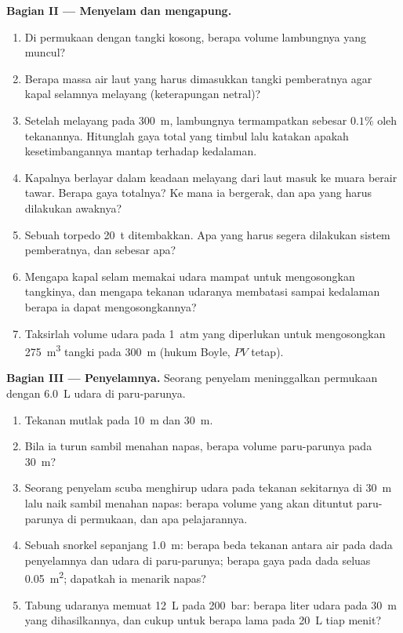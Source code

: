 \begin{problem}
\medskip
\noindent\textbf{Bagian II --- Menyelam dan mengapung.}
\begin{enumerate}[resume]
  \item Di permukaan dengan tangki kosong, berapa volume lambungnya yang muncul?
  \item Berapa massa air laut yang harus dimasukkan tangki pemberatnya agar
        kapal selamnya melayang (keterapungan netral)?
  \item Setelah melayang pada \qty{300}{m}, lambungnya termampatkan sebesar
        $0.1\%$ oleh tekanannya. Hitunglah gaya total yang timbul lalu katakan
        apakah kesetimbangannya mantap terhadap kedalaman.
  \item Kapalnya berlayar dalam keadaan melayang dari laut masuk ke
        muara berair tawar. Berapa gaya totalnya? Ke mana ia bergerak, dan apa yang harus dilakukan
        awaknya?
  \item Sebuah torpedo \qty{20}{t} ditembakkan. Apa yang harus segera dilakukan sistem
        pemberatnya, dan sebesar apa?
  \item Mengapa kapal selam memakai udara mampat untuk mengosongkan tangkinya, dan
        mengapa tekanan udaranya membatasi sampai kedalaman berapa ia dapat mengosongkannya?
  \item Taksirlah volume udara pada \qty{1}{atm} yang diperlukan untuk mengosongkan
        \qty{275}{m^3} tangki pada \qty{300}{m} (hukum Boyle, $PV$
        tetap).
\end{enumerate}

\medskip
\noindent\textbf{Bagian III --- Penyelamnya.}
Seorang penyelam meninggalkan permukaan dengan \qty{6.0}{L} udara di paru-parunya.
\begin{enumerate}[resume]
  \item Tekanan mutlak pada \qty{10}{m} dan \qty{30}{m}.
  \item Bila ia turun sambil menahan napas, berapa volume paru-parunya pada
        \qty{30}{m}?
  \item Seorang penyelam scuba menghirup udara pada tekanan sekitarnya di \qty{30}{m}
        lalu naik sambil menahan napas: berapa volume yang akan dituntut
        paru-parunya di permukaan, dan apa pelajarannya.
  \item Sebuah snorkel sepanjang \qty{1.0}{m}: berapa beda tekanan antara
        air pada dada penyelamnya dan udara di paru-parunya; berapa gaya pada
        dada seluas \qty{0.05}{m^2}; dapatkah ia menarik napas?
  \item Tabung udaranya memuat \qty{12}{L} pada \qty{200}{bar}: berapa liter
        udara pada \qty{30}{m} yang dihasilkannya, dan cukup untuk berapa lama pada
        \qty{20}{L} tiap menit?
\end{enumerate}


\end{problem}
